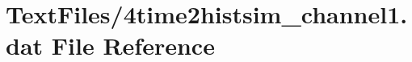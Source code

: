 \hypertarget{4time2histsim__channel1_8dat}{}\section{Text\+Files/4time2histsim\+\_\+channel1.dat File Reference}
\label{4time2histsim__channel1_8dat}
